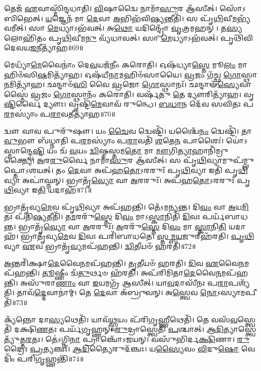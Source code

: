 𑌤𑍇𑌜᳴ \ul{𑌏}\-𑌵𑌾𑌸𑍍𑌮𑌿᳴𑌨𑍍𑌦𑌧𑌾𑌤𑌿।
\-\ul{𑌵𑌿}\-𑌷𑌾𑌦𑍍𑌵𑍈 𑌨𑌾𑌮𑌾᳴\-\ul{𑌸𑍁}\-𑌰 𑌆᳴𑌸𑍀𑌤𑍍।
𑌸𑍋᳴𑌽𑌬𑌿𑌭𑍇𑌤𑍍।
\-\ul{𑌯}\-𑌜𑍍𑌞𑍇𑌨᳴ 𑌮𑌾 \ul{𑌦𑍇}\-𑌵𑌾 \ul{𑌅}\-𑌭𑌿𑌭᳴𑌵𑌿\-\ul{𑌷𑍍𑌯}\-𑌨𑍍𑌤𑍀𑌤𑌿᳴।
𑌸 𑌪𑍃᳴\-\ul{𑌥𑌿}\-𑌵𑍀\-\ul{𑌮}\-𑌭𑍍𑌯᳴𑌵𑌮𑍀𑌤𑍍।
𑌸𑌾 \ul{𑌮𑍇}\-𑌧𑍍𑌯𑌾\-𑌽𑌭᳴𑌵𑌤𑍍।
𑌅\-\ul{𑌥𑍋} 𑌯𑌦𑌿𑌨𑍍𑌦𑍍𑌰𑍋᳴ \ul{𑌵𑍃}\-𑌤𑍍𑌰𑌮𑌹𑌨𑍍।
𑌤\-\ul{𑌸𑍍𑌯} 𑌲𑍋𑌹𑌿᳴𑌤𑌂 𑌪𑍃\-\ul{𑌥𑌿}\-𑌵𑍀𑌮\-\ul{𑌨𑍁} 𑌵𑍍𑌯᳴𑌧𑌾𑌵𑌤𑍍।
𑌸𑌾 \ul{𑌮𑍇}\-𑌧𑍍𑌯𑌾\-𑌽𑌭᳴𑌵𑌤𑍍।
𑌪𑍃𑌥𑌿᳴𑌵𑌿 𑌦𑍇𑌵𑌯\-\ul{𑌜}\-𑌨𑍀𑌤𑍍𑌯𑌾᳴𑌹॥69॥

𑌮𑍇𑌧𑍍𑌯𑌾᳴\-\ul{𑌮𑍇}\-𑌵𑍈𑌨𑌾𑌂॑ 𑌦𑍇\-\ul{𑌵}\-𑌯𑌜᳴𑌨𑍀𑌂 𑌕𑌰𑍋𑌤𑌿।
𑌓𑌷᳴𑌧𑍍𑌯𑌾\-\ul{𑌸𑍍𑌤𑍇} 𑌮𑍂\-\ul{𑌲𑌂} 𑌮𑌾 𑌹𑌿𑍞᳴𑌸𑌿\-\ul{𑌷}\-𑌮𑌿𑌤𑍍𑌯𑌾᳴𑌹।
𑌓𑌷᳴𑌧𑍀\-\ul{𑌨𑌾}\-𑌮𑌹𑌿𑍞᳴𑌸𑌾𑌯𑍈।
\-\ul{𑌵𑍍𑌰}\-𑌜𑌂 𑌗᳴𑌚𑍍𑌛 \ul{𑌗𑍋}\-𑌸𑍍𑌥𑌾\-\ul{𑌨}\-𑌮𑌿𑌤𑍍𑌯𑌾᳴𑌹।
𑌛𑌨𑍍𑌦𑌾𑍞᳴\-\ul{𑌸𑌿} 𑌵𑍈 \ul{𑌵𑍍𑌰}\-𑌜𑍋 \ul{𑌗𑍋}\-𑌸𑍍𑌥𑌾𑌨𑌃᳴।
𑌛𑌨𑍍𑌦𑌾𑍟᳴\-\ul{𑌸𑍍𑌯𑍇}\-𑌵𑌾𑌸𑍍𑌮𑍈॑ \ul{𑌵𑍍𑌰}\-𑌜𑌂 \ul{𑌗𑍋}\-𑌸𑍍𑌥𑌾𑌨𑌂᳴ 𑌕𑌰𑍋𑌤𑌿।
𑌵𑌰𑍍\mbox{}𑌷᳴𑌤𑍁 \ul{𑌤𑍇} 𑌦𑍍𑌯𑍗𑌰𑌿𑌤𑍍𑌯𑌾᳴𑌹।
𑌵𑍃\-\ul{𑌷𑍍𑌟𑌿}\-𑌰𑍍𑌵𑍈 𑌦𑍍𑌯𑍗𑌃।
𑌵𑍃𑌷𑍍𑌟𑌿᳴\-\ul{𑌮𑍇}\-𑌵𑌾𑌵᳴ 𑌰𑍁𑌨𑍍𑌧𑍇।
\-\ul{𑌬}\-\-\ul{𑌧𑌾}\-𑌨 𑌦𑍇᳴𑌵 𑌸𑌵𑌿𑌤𑌃 𑌪\-\ul{𑌰}\-𑌮𑌸𑍍𑌯𑌾𑌂॑ 𑌪\-\ul{𑌰𑌾}\-𑌵𑌤𑍀𑌤𑍍𑌯𑌾᳴𑌹॥70॥

𑌦𑍍𑌵𑍗 𑌵𑌾𑌵 𑌪𑍁𑌰𑍁᳴𑌷𑍗।
𑌯𑌂 \ul{𑌚𑍈}\-𑌵 𑌦𑍍𑌵𑍇𑌷𑍍𑌟𑌿᳴।
𑌯𑌶𑍍𑌚𑍈᳴\-\ul{𑌨𑌂} 𑌦𑍍𑌵𑍇𑌷𑍍𑌟𑌿᳴।
𑌤𑌾\-\ul{𑌵𑍁}\-𑌭𑍗 𑌬᳴𑌧𑍍𑌨𑌾𑌤𑌿 𑌪\-\ul{𑌰}\-𑌮𑌸𑍍𑌯𑌾𑌂॑ 𑌪\-\ul{𑌰𑌾}\-𑌵𑌤𑌿᳴ \ul{𑌶}\-𑌤𑍇\-\ul{𑌨} 𑌪𑌾𑌶𑍈𑌃॑।
𑌯𑍋॑𑌽𑌸𑍍𑌮𑌾𑌨𑍍𑌦𑍍𑌵𑍇\-\ul{𑌷𑍍𑌟𑌿} 𑌯𑌂 𑌚᳴ \ul{𑌵}\-𑌯𑌂 \ul{𑌦𑍍𑌵𑌿}\-𑌷𑍍𑌮𑌸𑍍𑌤𑌮\-\ul{𑌤𑍋} 𑌮𑌾 \ul{𑌮𑍗}\-𑌗𑌿\-\ul{𑌤𑍍𑌯𑌾}\-𑌹𑌾𑌨𑌿᳴𑌮𑍍𑌰𑍁𑌕𑍍𑌤𑍍𑌯𑍈।
\-\ul{𑌅}\-𑌰\-\ul{𑌰𑍁}\-𑌰𑍍𑌵𑍈 𑌨𑌾𑌮𑌾᳴\-\ul{𑌸𑍁}\-𑌰 𑌆᳴𑌸𑍀𑌤𑍍।
𑌸 𑌪𑍃᳴\-\ul{𑌥𑌿}\-𑌵𑍍𑌯𑌾𑌮𑍁𑌪᳴𑌮𑍍𑌲𑍁𑌪𑍍𑌤𑍋\-𑌽𑌶𑌯𑌤𑍍।
𑌤𑌂 \ul{𑌦𑍇}\-𑌵𑌾 𑌅𑌪᳴𑌹\-\ul{𑌤𑍋}\-\-𑌽𑌰𑌰𑍁𑌃᳴ 𑌪𑍃\-\ul{𑌥𑌿}\-𑌵𑍍𑌯𑌾 𑌇𑌤𑌿᳴ 𑌪𑍃\-\ul{𑌥𑌿}\-𑌵𑍍𑌯𑌾 𑌅𑌪𑌾॑𑌘𑍍𑌨𑌨𑍍।
𑌭𑍍𑌰𑌾𑌤𑍃᳴\-\ul{𑌵𑍍𑌯𑍋} 𑌵𑌾 \ul{𑌅}\-𑌰𑌰𑍁𑌃᳴।
𑌅𑌪᳴𑌹\-\ul{𑌤𑍋}\-\-𑌽𑌰𑌰𑍁𑌃᳴ 𑌪𑍃\-\ul{𑌥𑌿}\-𑌵𑍍𑌯𑌾 𑌇\-\ul{𑌤𑌿} 𑌯𑌦𑌾𑌹᳴॥71॥

𑌭𑍍𑌰𑌾𑌤𑍃᳴𑌵𑍍𑌯\-\ul{𑌮𑍇}\-𑌵 𑌪𑍃᳴\-\ul{𑌥𑌿}\-𑌵𑍍𑌯𑌾 𑌅𑌪᳴𑌹𑌨𑍍𑌤𑌿।
𑌤𑍇᳴𑌽𑌮𑌨𑍍𑌯𑌨𑍍𑌤।
𑌦𑌿\-\ul{𑌵𑌂} 𑌵𑌾 \ul{𑌅}\-𑌯\-\ul{𑌮𑌿}\-𑌤𑌃 𑌪᳴𑌤𑌿\-\ul{𑌷𑍍𑌯}\-𑌤𑍀𑌤𑌿᳴।
𑌤\-\ul{𑌮}\-𑌰𑌰𑍁᳴\-\ul{𑌸𑍍𑌤𑍇} 𑌦𑌿\-\ul{𑌵𑌂} 𑌮𑌾𑌽\-\ul{𑌸𑍍𑌕𑌾}\-𑌨𑌿𑌤𑌿᳴ \ul{𑌦𑌿}\-𑌵𑌃 𑌪𑌰𑍍𑌯᳴𑌬𑌾𑌧𑌨𑍍𑌤।
𑌭𑍍𑌰𑌾𑌤𑍃᳴\-\ul{𑌵𑍍𑌯𑍋} 𑌵𑌾 \ul{𑌅}\-𑌰𑌰𑍁𑌃᳴।
\-\ul{𑌅}\-𑌰𑌰𑍁᳴\-\ul{𑌸𑍍𑌤𑍇} 𑌦𑌿\-\ul{𑌵𑌂} 𑌮𑌾 \ul{𑌸𑍍𑌕𑌾}\-𑌨𑌿\-\ul{𑌤𑌿} 𑌯𑌦𑌾𑌹᳴।
𑌭𑍍𑌰𑌾𑌤𑍃᳴𑌵𑍍𑌯\-\ul{𑌮𑍇}\-𑌵 \ul{𑌦𑌿}\-𑌵𑌃 𑌪𑌰𑌿᳴𑌬𑌾𑌧𑌤𑍇।
\-\ul{𑌸𑍍𑌤}\-\-\ul{𑌮𑍍𑌬}\-\-\ul{𑌯}\-𑌜𑍁𑌰𑍍‌\mbox{}𑌹᳴𑌰𑌤𑌿।
\-\ul{𑌪𑍃}\-\-\ul{𑌥𑌿}\-𑌵𑍍𑌯𑌾 \ul{𑌏}\-𑌵 𑌭𑍍𑌰𑌾𑌤𑍃᳴\-\ul{𑌵𑍍𑌯}\-𑌮𑌪᳴𑌹𑌨𑍍𑌤𑌿।
\-\ul{𑌦𑍍𑌵𑌿}\-𑌤𑍀𑌯𑍞᳴ 𑌹𑌰𑌤𑌿॥72॥

\-\ul{𑌅}\-𑌨𑍍𑌤𑌰𑌿᳴𑌕𑍍𑌷𑌾\-\ul{𑌦𑍇}\-𑌵𑍈\-\ul{𑌨}\-𑌮𑌪᳴𑌹𑌨𑍍𑌤𑌿।
\-\ul{𑌤𑍃}\-𑌤𑍀𑌯𑍞᳴ 𑌹𑌰𑌤𑌿।
\-\ul{𑌦𑌿}\-𑌵 \ul{𑌏}\-𑌵𑍈\-\ul{𑌨}\-𑌮𑌪᳴𑌹𑌨𑍍𑌤𑌿।
\-\ul{𑌤𑍂}\-𑌷𑍍𑌣𑍀𑌂 𑌚᳴\-\ul{𑌤𑍁}\-𑌰𑍍𑌥𑍞 𑌹᳴𑌰𑌤𑌿।
𑌅𑌪᳴𑌰𑌿𑌮𑌿𑌤𑌾\-\ul{𑌦𑍇}\-𑌵𑍈\-\ul{𑌨}\-𑌮𑌪᳴\-𑌹𑌨𑍍𑌤𑌿।
𑌅𑌸𑍁᳴𑌰𑌾\-\ul{𑌣𑌾𑌂} 𑌵𑌾 \ul{𑌇}\-𑌯𑌮𑌗𑍍𑌰᳴ 𑌆𑌸𑍀𑌤𑍍।
𑌯𑌾\-\ul{𑌵}\-𑌦𑌾𑌸𑍀᳴𑌨𑌃 𑌪\-\ul{𑌰𑌾}\-𑌪𑌶𑍍𑌯᳴𑌤𑌿।
𑌤𑌾𑌵᳴\-\ul{𑌦𑍍𑌦𑍇}\-𑌵𑌾𑌨𑌾॑𑌮𑍍।
𑌤𑍇 \ul{𑌦𑍇}\-𑌵𑌾 𑌅᳴𑌬𑍍𑌰𑍁𑌵𑌨𑍍।
𑌅\-\ul{𑌸𑍍𑌤𑍍𑌵𑍇}\-𑌵 \ul{𑌨𑍋}\-\-𑌽𑌸𑍍𑌯𑌾𑌮𑌪𑍀𑌤𑌿᳴॥73॥

𑌕𑍍𑌯᳴𑌨𑍍𑌨𑍋 𑌦𑌾\-\ul{𑌸𑍍𑌯}\-𑌥𑍇𑌤𑌿᳴।
𑌯𑌾𑌵᳴\-\ul{𑌥𑍍𑌸𑍍𑌵}\-𑌯𑌂 𑌪᳴𑌰𑌿𑌗𑍃\-\ul{𑌹𑍍𑌣𑍀}\-𑌥𑍇𑌤𑌿᳴।
𑌤𑍇 𑌵𑌸᳴\-\ul{𑌵}\-𑌸𑍍𑌤𑍍𑌵𑍇𑌤𑌿᳴ 𑌦𑌕𑍍𑌷𑌿\-\ul{𑌣}\-𑌤𑌃 𑌪𑌰𑍍𑌯᳴𑌗𑍃𑌹𑍍𑌣𑌨𑍍।
\-\ul{𑌰𑍁}\-𑌦𑍍𑌰𑌾𑌸𑍍𑌤𑍍𑌵𑍇𑌤𑌿᳴ \ul{𑌪}\-𑌶𑍍𑌚𑌾𑌤𑍍।
\-\ul{𑌆}\-\-\ul{𑌦𑌿}\-𑌤𑍍𑌯𑌾𑌸𑍍𑌤𑍍𑌵𑍇𑌤𑍍𑌯𑍁᳴𑌤𑍍𑌤\-\ul{𑌰}\-𑌤𑌃।
𑌤𑍇॑𑌽𑌗𑍍𑌨𑌿\-\ul{𑌨𑌾} 𑌪𑍍𑌰𑌾𑌞𑍍𑌚𑍋᳴\-𑌽𑌜𑌯𑌨𑍍।
𑌵𑌸𑍁᳴𑌭𑌿𑌰𑍍𑌦\-\ul{𑌕𑍍𑌷𑌿}\-𑌣𑌾।
\-\ul{𑌰𑍁}\-𑌦𑍍𑌰𑍈𑌃 \ul{𑌪𑍍𑌰}\-𑌤𑍍𑌯𑌞𑍍𑌚𑌃᳴।
\-\ul{𑌆}\-\-\ul{𑌦𑌿}\-𑌤𑍍𑌯𑍈𑌰𑍁𑌦᳴𑌞𑍍𑌚𑌃।
𑌯\-\ul{𑌸𑍍𑌯𑍈}\-𑌵𑌂 \ul{𑌵𑌿}\-𑌦𑍁\-\ul{𑌷𑍋} 𑌵𑍇𑌦𑌿𑌂᳴ 𑌪𑌰𑌿\-\ul{𑌗𑍃}\-𑌹𑍍𑌣𑌨𑍍𑌤𑌿᳴॥74॥


